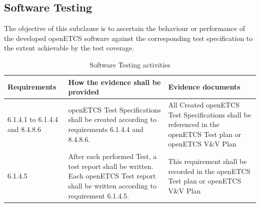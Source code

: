 \documentclass{template/openetcs_report}
\begin{document}
\subsection{Software Testing}
\begin{flushleft}
The objective of this subclause is to ascertain the behaviour or performance of the developed openETCS software against the corresponding test specification to the extent achievable by the test coverage.
\end{flushleft}
{\footnotesize\sffamily\centering
\begin{longtable}{|p{2cm}|p{9cm}|p{3cm}|}
\caption{Software Testing activities}\\
\hline
\bfseries Requirements & \bfseries How the evidence shall be provided & \bfseries Evidence documents\\
\hline
\hline
\endhead
\hline
\endfoot

6.1.4.1 to 6.1.4.4 and 8.4.8.6 & openETCS Test Specifications shall be created according to requirements 6.1.4.4 and 8.4.8.6.
& All Created openETCS Test Specifications shall be referenced in the openETCS Test plan or openETCS V\&V Plan\\ 
\hline
6.1.4.5 & After each performed Test, a test report shall be written. 
Each openETCS Test report shall be written according to requirement 6.1.4.5.
& This requirement shall be recorded in the openETCS Test plan or openETCS V\&V Plan\\ 
\hline
\end{longtable}}
\end{document}
